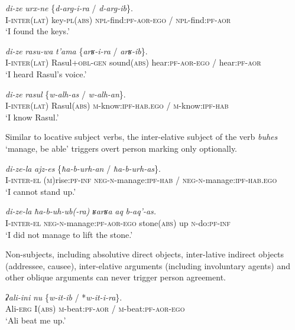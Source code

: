 ﻿\documentclass[output=paper]{langsci/langscibook}
\begin{document}
\ea %
\gll \emph{di-ze} \emph{urx-ne} \{\emph{d-arg-i-ra} / \emph{d-arg-ib}\}.\\
I-\textsc{inter(lat)} key-\textsc{pl}(\textsc{abs}) \textsc{npl}-find:\textsc{pf}-\textsc{aor}-\textsc{ego} / \textsc{npl}-find:\textsc{pf}-\textsc{aor}\\
\glt `I found the keys.'

\ex %
\gll \emph{di-ze} \emph{rasu-wa} \emph{t'ama} \{\emph{arʁ-i-ra} / \emph{arʁ-ib}\}.\\
I-\textsc{inter(lat)} Rasul+\textsc{obl}-\textsc{gen} sound(\textsc{abs}) hear:\textsc{pf}-\textsc{aor}-\textsc{ego} / hear:\textsc{pf}-\textsc{aor}\\
\glt `I heard Rasul's voice.'

\ex %
\gll \emph{di-ze} \emph{rasul} \{\emph{w-alh-as} / \emph{w-alh-an}\}.\\
I-\textsc{inter(lat)} Rasul(\textsc{abs}) \textsc{m}-know:\textsc{ipf}-\textsc{hab}.\textsc{ego} / \textsc{m}-know:\textsc{ipf}-\textsc{hab}\\
\glt `I know Rasul.'
\z

Similar to locative subject verbs, the inter-elative subject of the verb
\emph{buhes} `manage, be able' triggers overt person marking only
optionally.

\ea %
\gll \emph{di-ze-la} \emph{ajz-es} \{\emph{ħa-b-urh-an} / \emph{ħa-b-urh-as}\}.\\
I-\textsc{inter}-\textsc{el} (\textsc{m})rise:\textsc{pf}-\textsc{inf} \textsc{neg}-\textsc{n}-manage:\textsc{ipf}-\textsc{hab} / \textsc{neg}-\textsc{n}-manage:\textsc{ipf}-\textsc{hab}.\textsc{ego}\\
\glt `I cannot stand up.'

\ex %
\gll \emph{di-ze-la} \emph{ħa-b-uh-ub(-ra)} \emph{ʁarʁa} \emph{aq} \emph{b-aq'-as.}\\
I-\textsc{inter}-\textsc{el} \textsc{neg}-\textsc{n}-manage:\textsc{pf}-\textsc{aor}-\textsc{ego} stone(\textsc{abs}) up \textsc{n}-do:\textsc{pf}-\textsc{inf}\\
\glt `I did not manage to lift the stone.'
\z

Non-subjects, including absolutive direct objects, inter-lative indirect
objects (addressee, causee), inter-elative arguments (including
involuntary agents) and other oblique arguments can never trigger person
agreement.

\ea %
\gll \emph{ʡali-ini} \emph{nu} \{\emph{w-it-ib} / *\emph{w-it-i-ra}\}.\\
Ali-\textsc{erg} I(\textsc{abs}) \textsc{m}-beat:\textsc{pf}-\textsc{aor} / \textsc{m}-beat:\textsc{pf}-\textsc{aor}-\textsc{ego}\\
\glt `Ali beat me up.'
\end{document}
